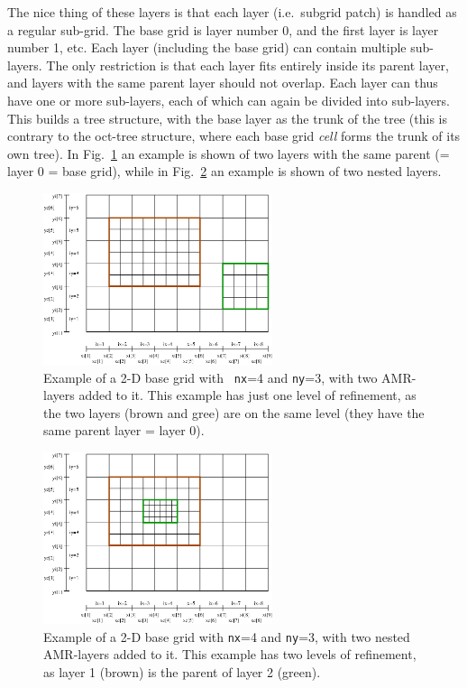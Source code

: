 \documentclass{report}
\begin{document}
The nice thing of these layers is that each layer (i.e.\ subgrid patch) is
handled as a regular sub-grid. The base grid is layer number 0, and the
first layer is layer number 1, etc. Each layer (including the base grid) can
contain multiple sub-layers. The only restriction is that each layer fits
entirely inside its parent layer, and layers with the same parent layer
should not overlap. Each layer can thus have one or more sub-layers, each of
which can again be divided into sub-layers. This builds a tree structure,
with the base layer as the trunk of the tree (this is contrary to the
oct-tree structure, where each base grid {\em cell} forms the trunk of its
own tree). In Fig.~\ref{fig-twolayer-amr} an example is shown of two layers
with the same parent (= layer 0 = base grid), while in
Fig.~\ref{fig-nestedlayer-amr} an example is shown of two nested layers.
%
\begin{figure}
\centerline{\includegraphics[width=0.6\textwidth]{twolayer_bare.eps}}
\caption{\label{fig-twolayer-amr} Example of a 2-D base grid with {\small\tt
    nx}=4 and {\small\tt ny}=3, with two AMR-layers added to it.  This
  example has just one level of refinement, as the two layers (brown and
  gree) are on the same level (they have the same parent layer = layer 0).
}
\end{figure}
%
\begin{figure}
\centerline{\includegraphics[width=0.6\textwidth]{nestedlayer_bare.eps}}
\caption{\label{fig-nestedlayer-amr} Example of a 2-D base grid with
  {\small\tt nx}=4 and {\small\tt ny}=3, with two nested AMR-layers added to
  it.  This example has two levels of refinement, as layer 1 (brown) is the
  parent of layer 2 (green).  }
\end{figure}
%
\end{document}
